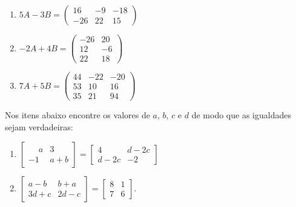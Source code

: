 \documentclass[12pt]{exam}
\begin{document}
\begin{exercicio}
\begin{solucao}
\begin{enumerate}[label={\alph*})]
            \item $5A - 3B = \begin{pmatrix}16 & -9 & -18\\-26 & 22 & 15\end{pmatrix}$
            \item $-2A + 4B = \begin{pmatrix}-26 & 20\\12 & -6\\22 & 18\end{pmatrix}$
            \item $7A + 5B = \begin{pmatrix}44 & -22 & -20\\53 & 10 & 16\\35 & 21 & 94\end{pmatrix}$
        \end{enumerate}
    \end{solucao}
\end{exercicio}

\begin{exercicio}
    \label{igualdade_de_matrizes} Nos itens abaixo encontre os valores de $a$, $b$, $c$ e $d$ de modo que as igualdades sejam verdadeiras:
    \begin{enumerate}[label={\alph*})]
        \item $\begin{bmatrix}\phantom{-} a & 3\\-1 & a + b\end{bmatrix} = \begin{bmatrix}4 & d - 2c\\d - 2c & -2\end{bmatrix}$
        \item $\begin{bmatrix}a - b & b + a\\3d + c & 2d - c\end{bmatrix} = \begin{bmatrix}8 & 1\\7 & 6\end{bmatrix}$.
    \end{enumerate}
\end{exercicio}
\end{document}
